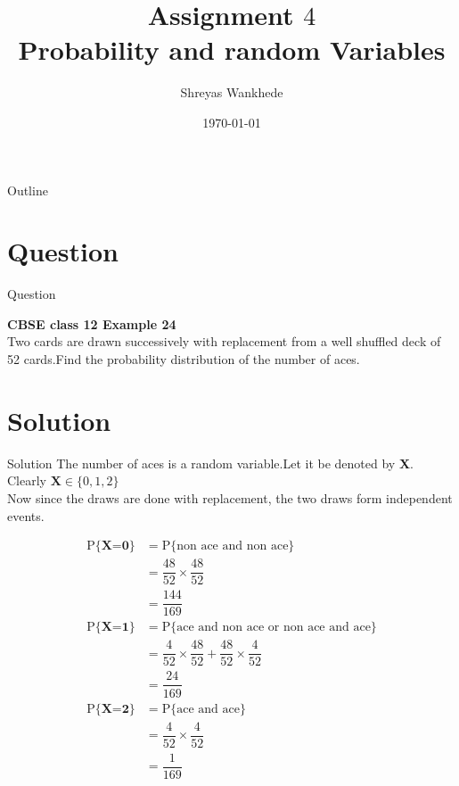 \documentclass{beamer}
\title{Assignment $4$\\ Probability and random Variables}
\institute{Indian Institute of Technology Hyderabad}
\author{Shreyas Wankhede}
\date{\today}
\begin{document}
\begin{frame}
    \titlepage 
\end{frame}

\logo{}


\begin{frame}{Outline}
    \tableofcontents
\end{frame}


\section{Question}
\begin{frame}{Question}

\textbf{CBSE class 12 Example 24}\\\vspace{5mm}
Two cards are drawn successively with replacement from a well shuffled deck of 52 cards.Find the probability distribution of the number of aces.\\

\end{frame}


\section{Solution}
\begin{frame}{Solution}
    The number of aces is a random variable.Let it be denoted by \textbf{X}. Clearly $\textbf{X} \in \{0,1,2\}$ \\
Now since the draws are done with replacement, the two draws form independent events.

\end{frame} 

\begin{frame}[t]{}
  \begin{align}
 \text{P} \{\textbf{X=0}\} &= \text{P}\{\text{non ace and non ace}\}\nonumber\\
 &=\dfrac{48}{52}\times\dfrac{48}{52}\nonumber\\
 &=\dfrac{144}{169}\label{eq:1}\\
  \text{P} \{\textbf{X=1}\} &= \text{P}\{\text{ace and non ace or non ace and ace}\}\nonumber\\
 &=\dfrac{4}{52}\times\dfrac{48}{52} + \dfrac{48}{52}\times\dfrac{4}{52}\nonumber\\
 &=\dfrac{24}{169}\label{eq:2}\\
  \text{P} \{\textbf{X=2}\} &= \text{P}\{\text{ace and ace}\}\nonumber\\
 &=\dfrac{4}{52}\times\dfrac{4}{52}\nonumber\\
 &=\dfrac{1}{169}\label{eq:3}
\end{align}  
\end{frame}
\end{document}
